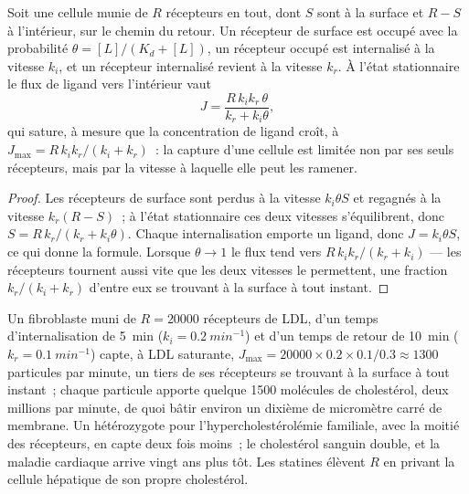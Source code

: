 \begin{proposition}\label{prop:b3:membrane-traffic:uptake}
Soit une cellule munie de $R$ récepteurs en tout, dont $S$ sont à la
surface et $R - S$ à l'intérieur, sur le chemin du retour. Un récepteur
de surface est occupé avec la probabilité
$\theta = [L]/(K_{d} + [L])$, un récepteur occupé est internalisé à la
vitesse $k_{i}$, et un récepteur internalisé revient à la vitesse
$k_{r}$. À l'état stationnaire le flux de ligand vers l'intérieur vaut
\[
J = \frac{R\,k_{i}k_{r}\,\theta}{k_{r} + k_{i}\theta},
\]
qui sature, à mesure que la concentration de ligand croît, à $J_{\max} =
R\,k_{i}k_{r}/(k_{i} + k_{r})$~: la capture d'une cellule est limitée
non par ses seuls récepteurs, mais par la vitesse à laquelle elle peut
les ramener.
\end{proposition}
\begin{proof}
Les récepteurs de surface sont perdus à la vitesse $k_{i}\theta S$ et
regagnés à la vitesse $k_{r}(R - S)$~; à l'état stationnaire ces deux
vitesses s'équilibrent, donc $S = R\,k_{r}/(k_{r}
+ k_{i}\theta)$. Chaque internalisation emporte un ligand, donc $J =
k_{i}\theta S$, ce qui donne la formule. Lorsque $\theta \to 1$ le flux
tend vers $R\,k_{i}k_{r}/(k_{r} + k_{i})$ --- les récepteurs tournent
aussi vite que les deux vitesses le permettent, une fraction
$k_{r}/(k_{i} + k_{r})$ d'entre eux se trouvant à la surface à tout
instant.
\end{proof}

\begin{example}\label{ex:b3:membrane-traffic:ldl}
Un fibroblaste muni de $R = \num{20000}$ récepteurs de LDL, d'un temps
d'internalisation de \qty{5}{min} ($k_{i} = \qty{0.2}{min^{-1}}$) et
d'un temps de retour de \qty{10}{min} ($k_{r} = \qty{0.1}{min^{-1}}$)
capte, à LDL saturante,
$J_{\max} = \num{20000}\times 0.2\times 0.1/0.3 \approx 1300$
particules par minute, un tiers de ses récepteurs se trouvant à la
surface à tout instant~; chaque particule apporte quelque
\num{1500} molécules de cholestérol, deux millions par minute, de quoi
bâtir environ un dixième de micromètre carré de membrane. Un
hétérozygote pour l'hypercholestérolémie familiale, avec la moitié des
récepteurs, en capte deux fois moins~; le cholestérol sanguin double, et
la maladie cardiaque arrive vingt ans plus tôt. Les statines élèvent $R$
en privant la cellule hépatique de son propre cholestérol.
\end{example}

